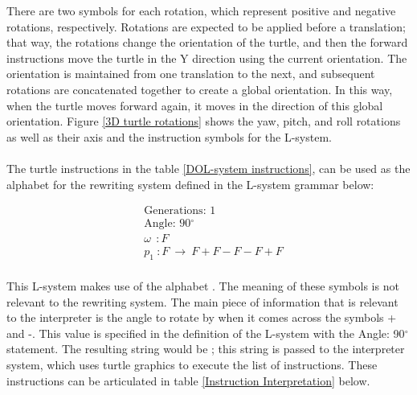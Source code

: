 There are two symbols for each rotation, which represent positive and negative rotations, respectively. Rotations are expected to be applied before a translation; that way, the rotations change the orientation of the turtle, and then the forward instructions move the turtle in the Y direction using the current orientation. The orientation is maintained from one translation to the next, and subsequent rotations are concatenated together to create a global orientation. In this way, when the turtle moves forward again, it moves in the direction of this global orientation. Figure \ref{3D turtle rotations} shows the yaw, pitch, and roll rotations as well as their axis and the instruction symbols for the L-system.\\
\\
The turtle instructions in the table \ref{DOL-system instructions}, can be used as the alphabet for the rewriting system defined in the L-system grammar below:

\begin{equation} \label{DOL-system example}
\begin{aligned}
	&\text{Generations: 1}\\
	&\text{Angle: 90$^{\circ}$}\\
	&\omega~~ : F \\
	&p_1~ :  F~ \rightarrow~ F+F-F-F+F\\
\end{aligned}
\end{equation}

\noindent
This L-system makes use of the alphabet . The meaning of these symbols is not relevant to the rewriting system. The main piece of information that is relevant to the interpreter is the angle to rotate by when it comes across the symbols + and -. This value is specified in the definition of the L-system with the Angle: 90$^{\circ}$ statement. The resulting string would be ; this string is passed to the interpreter system, which uses turtle graphics to execute the list of instructions. These instructions can be articulated in table \ref{Instruction Interpretation} below.

